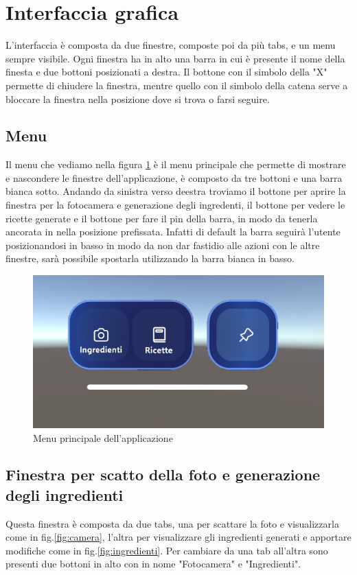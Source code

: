 \section{Interfaccia grafica}
L'interfaccia è composta da due finestre, composte poi da più tabs, e un menu sempre visibile. Ogni finestra ha in alto una barra in cui è presente il nome della finesta e due bottoni posizionati a destra. Il bottone con il simbolo della "X" permette di chiudere la finestra, mentre quello con il simbolo della catena serve a bloccare la finestra nella posizione dove si trova o farsi seguire.
\subsection{Menu}
Il menu che vediamo nella figura \ref{fig:menu} è il menu principale che permette di mostrare e nascondere le finestre dell'applicazione, è composto da tre bottoni e una barra bianca sotto. Andando da sinistra verso deestra troviamo il bottone per aprire la finestra per la fotocamera e generazione degli ingredenti, il bottone per vedere le ricette generate e il bottone per fare il pin della barra, in modo da tenerla ancorata in nella posizione prefissata. Infatti di default la barra seguirà l'utente posizionandosi in basso in modo da non dar fastidio alle azioni con le altre finestre, sarà possibile spostarla utilizzando la barra bianca in basso.
\begin{figure}[H]
    \centering
    \includegraphics[width=\textwidth,height=\textheight,keepaspectratio]{figures/chapter_1/MENU_interfaccia.png}
    \caption{Menu principale dell'applicazione}
    \label{fig:menu}
\end{figure}
\subsection{Finestra per scatto della foto e generazione degli ingredienti}
Questa finestra è composta da due tabs, una per scattare la foto e visualizzarla come in fig.\ref{fig:camera}, l'altra per visualizzare gli ingredienti generati e apportare modifiche come in fig.\ref{fig:ingredienti}. Per cambiare da una tab all'altra sono presenti due bottoni in alto con in nome "Fotocamera" e "Ingredienti".
